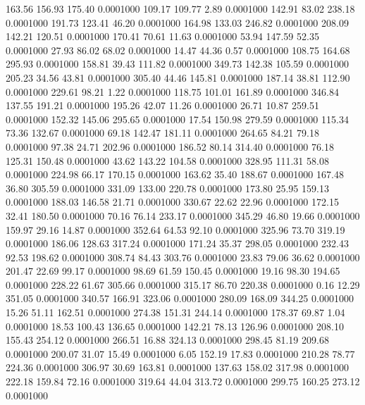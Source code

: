  163.56  156.93  175.40   0.0001000
 109.17  109.77    2.89   0.0001000
 142.91   83.02  238.18   0.0001000
 191.73  123.41   46.20   0.0001000
 164.98  133.03  246.82   0.0001000
 208.09  142.21  120.51   0.0001000
 170.41   70.61   11.63   0.0001000
  53.94  147.59   52.35   0.0001000
  27.93   86.02   68.02   0.0001000
  14.47   44.36    0.57   0.0001000
 108.75  164.68  295.93   0.0001000
 158.81   39.43  111.82   0.0001000
 349.73  142.38  105.59   0.0001000
 205.23   34.56   43.81   0.0001000
 305.40   44.46  145.81   0.0001000
 187.14   38.81  112.90   0.0001000
 229.61   98.21    1.22   0.0001000
 118.75  101.01  161.89   0.0001000
 346.84  137.55  191.21   0.0001000
 195.26   42.07   11.26   0.0001000
  26.71   10.87  259.51   0.0001000
 152.32  145.06  295.65   0.0001000
  17.54  150.98  279.59   0.0001000
 115.34   73.36  132.67   0.0001000
  69.18  142.47  181.11   0.0001000
 264.65   84.21   79.18   0.0001000
  97.38   24.71  202.96   0.0001000
 186.52   80.14  314.40   0.0001000
  76.18  125.31  150.48   0.0001000
  43.62  143.22  104.58   0.0001000
 328.95  111.31   58.08   0.0001000
 224.98   66.17  170.15   0.0001000
 163.62   35.40  188.67   0.0001000
 167.48   36.80  305.59   0.0001000
 331.09  133.00  220.78   0.0001000
 173.80   25.95  159.13   0.0001000
 188.03  146.58   21.71   0.0001000
 330.67   22.62   22.96   0.0001000
 172.15   32.41  180.50   0.0001000
  70.16   76.14  233.17   0.0001000
 345.29   46.80   19.66   0.0001000
 159.97   29.16   14.87   0.0001000
 352.64   64.53   92.10   0.0001000
 325.96   73.70  319.19   0.0001000
 186.06  128.63  317.24   0.0001000
 171.24   35.37  298.05   0.0001000
 232.43   92.53  198.62   0.0001000
 308.74   84.43  303.76   0.0001000
  23.83   79.06   36.62   0.0001000
 201.47   22.69   99.17   0.0001000
  98.69   61.59  150.45   0.0001000
  19.16   98.30  194.65   0.0001000
 228.22   61.67  305.66   0.0001000
 315.17   86.70  220.38   0.0001000
   0.16   12.29  351.05   0.0001000
 340.57  166.91  323.06   0.0001000
 280.09  168.09  344.25   0.0001000
  15.26   51.11  162.51   0.0001000
 274.38  151.31  244.14   0.0001000
 178.37   69.87    1.04   0.0001000
  18.53  100.43  136.65   0.0001000
 142.21   78.13  126.96   0.0001000
 208.10  155.43  254.12   0.0001000
 266.51   16.88  324.13   0.0001000
 298.45   81.19  209.68   0.0001000
 200.07   31.07   15.49   0.0001000
   6.05  152.19   17.83   0.0001000
 210.28   78.77  224.36   0.0001000
 306.97   30.69  163.81   0.0001000
 137.63  158.02  317.98   0.0001000
 222.18  159.84   72.16   0.0001000
 319.64   44.04  313.72   0.0001000
 299.75  160.25  273.12   0.0001000
